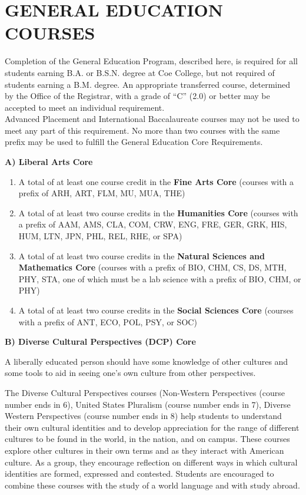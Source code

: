 \documentclass[
  letterpaper,
]{scrbook}
\providecommand{\tightlist}{%
  \setlength{\itemsep}{0pt}\setlength{\parskip}{0pt}}
\begin{document}
\hypertarget{sec-general-education-courses}{%
\chapter{GENERAL EDUCATION
COURSES}\label{sec-general-education-courses}}

Completion of the General Education Program, described here, is required
for all students earning B.A. or B.S.N. degree at Coe College, but not
required of students earning a B.M. degree. An appropriate transferred
course, determined by the Office of the Registrar, with a grade of ``C''
(2.0) or better may be accepted to meet an individual requirement.\\
Advanced Placement and International Baccalaureate courses may not be
used to meet any part of this requirement. No more than two courses with
the same prefix may be used to fulfill the General Education Core
Requirements.

\textbf{A) Liberal Arts Core}

\begin{enumerate}
\def\labelenumi{\arabic{enumi}.}
\tightlist
\item
  A total of at least one course credit in the \textbf{Fine Arts Core}
  (courses with a prefix of ARH, ART, FLM, MU, MUA, THE)
\item
  A total of at least two course credits in the \textbf{Humanities Core}
  (courses with a prefix of AAM, AMS, CLA, COM, CRW, ENG, FRE, GER, GRK,
  HIS, HUM, LTN, JPN, PHL, REL, RHE, or SPA)
\item
  A total of at least two course credits in the \textbf{Natural Sciences
  and Mathematics Core} (courses with a prefix of BIO, CHM, CS, DS, MTH,
  PHY, STA, one of which must be a lab science with a prefix of BIO,
  CHM, or PHY)
\item
  A total of at least two course credits in the \textbf{Social Sciences
  Core} (courses with a prefix of ANT, ECO, POL, PSY, or SOC)
\end{enumerate}

\textbf{B) Diverse Cultural Perspectives (DCP) Core}

A liberally educated person should have some knowledge of other cultures
and some tools to aid in seeing one's own culture from other
perspectives.

The Diverse Cultural Perspectives courses (Non-Western Perspectives
(course number ends in 6), United States Pluralism (course number ends
in 7), Diverse Western Perspectives (course number ends in 8) help
students to understand their own cultural identities and to develop
appreciation for the range of different cultures to be found in the
world, in the nation, and on campus. These courses explore other
cultures in their own terms and as they interact with American culture.
As a group, they encourage reflection on different ways in which
cultural identities are formed, expressed and contested. Students are
encouraged to combine these courses with the study of a world language
and with study abroad.
\end{document}

